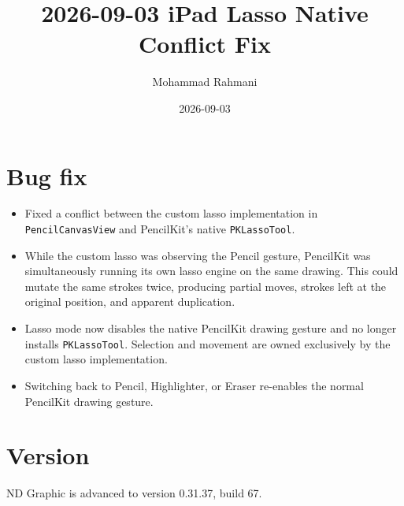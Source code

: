 \documentclass[a4paper]{article}
\title{2026-09-03 iPad Lasso Native Conflict Fix}
\date{2026-09-03}
\author{Mohammad Rahmani}
\begin{document}
   \maketitle

   \section{Bug fix}
   \begin{itemize}
      \item Fixed a conflict between the custom lasso implementation in \texttt{PencilCanvasView} and PencilKit's native \texttt{PKLassoTool}.
      \item While the custom lasso was observing the Pencil gesture, PencilKit was simultaneously running its own lasso engine on the same drawing. This could mutate the same strokes twice, producing partial moves, strokes left at the original position, and apparent duplication.
      \item Lasso mode now disables the native PencilKit drawing gesture and no longer installs \texttt{PKLassoTool}. Selection and movement are owned exclusively by the custom lasso implementation.
      \item Switching back to Pencil, Highlighter, or Eraser re-enables the normal PencilKit drawing gesture.
   \end{itemize}

   \section{Version}
   ND Graphic is advanced to version 0.31.37, build 67.

   
   
\end{document}
